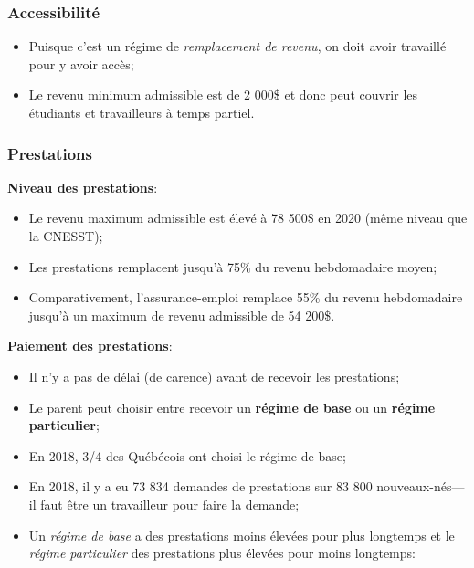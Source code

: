 \documentclass[10pt, french]{article}
\begin{document}
\begin{multicols*}{3}
\subsubsection*{Accessibilité}
\begin{itemize}[leftmargin = *]
	\item	Puisque c'est un régime de \textit{remplacement de revenu}, on doit avoir travaillé pour y avoir accès;
	\item	Le revenu minimum admissible est de 2 000\$ et donc peut couvrir les étudiants et travailleurs à temps partiel.
\end{itemize}

\subsubsection*{Prestations}
\textbf{Niveau des prestations}:
\begin{itemize}[leftmargin = *]
	\item	Le revenu maximum admissible est élevé à 78 500\$ en 2020 (même niveau que la CNESST);
	\item	Les prestations remplacent jusqu'à 75\% du revenu hebdomadaire moyen;
	\item	Comparativement, l'assurance-emploi remplace 55\% du revenu hebdomadaire jusqu'à un maximum de revenu admissible de 54 200\$.
\end{itemize}

\textbf{Paiement des prestations}:
\begin{itemize}[leftmargin = *]
	\item	Il n'y a pas de délai (de carence) avant de recevoir les prestations;
	\item	Le parent peut choisir entre recevoir un \textbf{régime de base} ou un \textbf{régime particulier};
	\item	En 2018, 3/4 des Québécois ont choisi le régime de base;
	\item	En 2018, il y a eu 73 834 demandes de prestations sur 83 800 nouveaux-nés---il faut être un travailleur pour faire la demande;
	\item	Un \textit{régime de base} a des prestations moins élevées pour plus longtemps et le \textit{régime particulier} des prestations plus élevées pour moins longtemps:
\end{itemize}


\end{multicols*}
\end{document}
